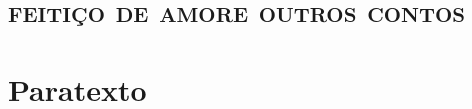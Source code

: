 
\part[feitiço de amor e outros contos]{\textsc{feitiço de amor\break e outros contos} }

\part{Paratexto}
